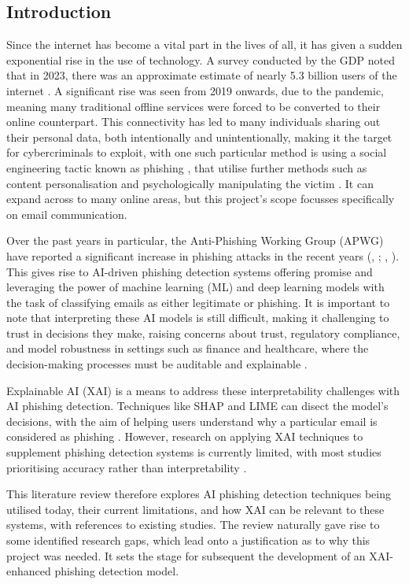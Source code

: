 
\subsection*{Introduction}

Since the internet has become a vital part in the lives of all, it has given a sudden exponential rise in the use of technology. A survey conducted by the GDP noted that in 2023, there was an approximate estimate of nearly 5.3 billion users of the internet \citep{kemp2022digital}. A significant rise was seen from 2019 onwards, due to the pandemic, meaning many traditional offline services were forced to be converted to their online counterpart. This connectivity has led to many individuals sharing out their personal data, both intentionally and unintentionally, making it the target for cybercriminals to exploit, with one such particular method is using a social engineering tactic known as phishing \citep{zahra2022detecting}, that utilise further methods such as content personalisation and psychologically manipulating the victim \citep{jagatic2007social}. It can expand across to many online areas, but this project's scope focusses specifically on email communication.\newline 

\noindent Over the past years in particular, the Anti-Phishing Working Group (APWG) have reported a significant increase in phishing attacks in the recent years (\citeauthor{chirra2020ai}, \citeyear{chirra2020ai}; \citeauthor{syed2018ensuring}, \citeyear{syed2018ensuring}). This gives rise to AI-driven phishing detection systems offering promise and leveraging the power of machine learning (ML) and deep learning models with the task of classifying emails as either legitimate or phishing. It is important to note that interpreting these AI models is still difficult, making it challenging to trust in decisions they make, raising concerns about trust, regulatory compliance, and model robustness in settings such as finance and healthcare, where the decision-making processes must be auditable and explainable \citep{jain2022survey}.\newline

\noindent Explainable AI (XAI) is a means to address these interpretability challenges with AI phishing detection. Techniques like SHAP and LIME can disect the model's decisions, with the aim of helping users understand why a particular email is considered as phishing \citep{lundberg2017unified}. However, research on applying XAI techniques to supplement phishing detection systems is currently limited, with most studies prioritising accuracy rather than interpretability \citep{ribeiro2016model}.\newline

\noindent This literature review therefore explores AI phishing detection techniques being utilised today, their current limitations, and how XAI can be relevant to these systems, with references to existing studies. The review naturally gave rise to some identified research gaps, which lead onto a justification as to why this project was needed. It sets the stage for subsequent the development of an XAI-enhanced phishing detection model.
